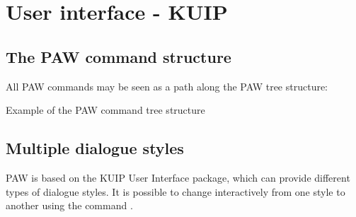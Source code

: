 
\chapter{User interface - KUIP}

\section{The PAW command structure}
\label{sec:HCOTREE}

All PAW commands may be seen as a path along the
PAW tree structure:

\begin{Fighere}

\caption{Example of the PAW command tree structure}
\label{fig:TREE}
\end{Fighere}

%
%
\newpage

\section{Multiple dialogue styles}

PAW is based on the KUIP \cite{bib-KUIP} User Interface package,
which can provide different types of dialogue styles.
It is possible to change interactively from one style to another using
the command .
 
